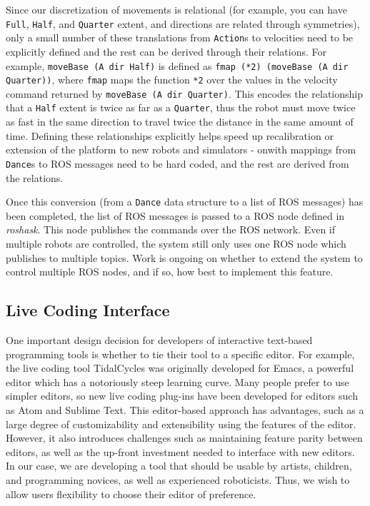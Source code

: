 \documentclass[sigconf]{acmart}
\begin{document}
Since our discretization of movements is relational (for
example, you can have \texttt{Full}, \texttt{Half}, and \texttt{Quarter} extent,
and directions are related through symmetries), only a small number of these
translations from \texttt{Action}s to velocities need to be explicitly defined
and the rest can be derived through their relations. For example,
\texttt{moveBase (A dir Half)} is defined as \texttt{fmap (*2) (moveBase (A dir
Quarter))},
where \texttt{fmap} maps the function \texttt{*2} over the values in the velocity
command returned by \texttt{moveBase (A dir Quarter)}. This encodes the relationship
that a \texttt{Half} extent is twice as far as a \texttt{Quarter}, thus the
robot must move twice as fast in the same direction to travel twice the distance
in the same amount of time. Defining these relationships explicitly helps speed
up recalibration or extension of the platform to new robots and simulators -
onwith mappings from \texttt{Dance}s to ROS messages need to be hard coded,
and the rest are derived from the relations.

Once this conversion (from a \texttt{Dance} data structure to a list of ROS messages)
has been completed, the list of ROS messages is passed to a ROS
node defined in \emph{roshask}. This node publishes the commands over the ROS network.
Even if multiple robots are controlled, the system still only uses one ROS node
which publishes to multiple topics. Work is ongoing on whether to extend the
system to control multiple ROS nodes, and if so, how best to implement this
feature.

\subsection{Live Coding Interface}\label{live-coding-interface}

One important design decision for developers of interactive text-based
programming tools is whether to tie their tool to a specific editor. For
example, the live coding tool TidalCycles was originally
developed for Emacs, a powerful editor which has a notoriously steep
learning curve. Many people prefer to use simpler editors, so new
live coding plug-ins have been developed for editors such as Atom and
Sublime Text. This editor-based approach has advantages, such as a large
degree of customizability and extensibility using the features of the
editor. However, it also introduces challenges such as maintaining
feature parity between editors, as well as the up-front investment
needed to interface with new editors. In our case, we are developing a
tool that should be usable by artists, children, and programming
novices, as well as experienced roboticists. Thus, we wish to allow
users flexibility to choose their editor of preference.
\end{document}
